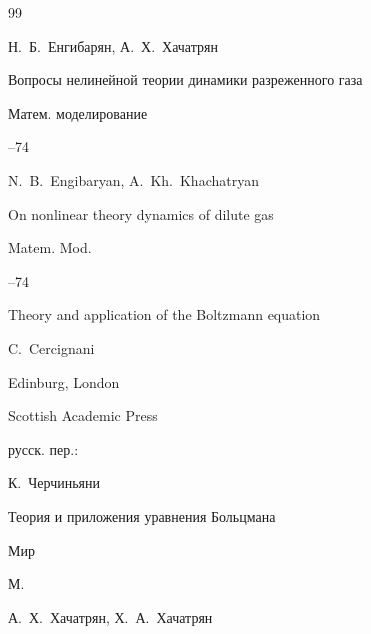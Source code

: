\begin{thebibliography}{99}




\by Н.~Б.~Енгибарян, А.~Х.~Хачатрян

\paper Вопросы нелинейной теории динамики разреженного газа

\jour Матем. моделирование




--74




\misctransl 

\by N.~B.~Engibaryan, A.~Kh.~Khachatryan

\paper On nonlinear theory dynamics of dilute gas

\jour Matem. Mod.




--74




\book Theory and application of the Boltzmann equation

\by C.~Cercignani

\publaddr Edinburg, London

\publ Scottish Academic Press



\rtransl русск. пер.:~

\by  К.~Черчиньяни

\book Теория и приложения уравнения Больцмана

\publ Мир

\publaddr М.






\by А.~Х.~Хачатрян, Х.~А.~Хачатрян


\end{thebibliography}
